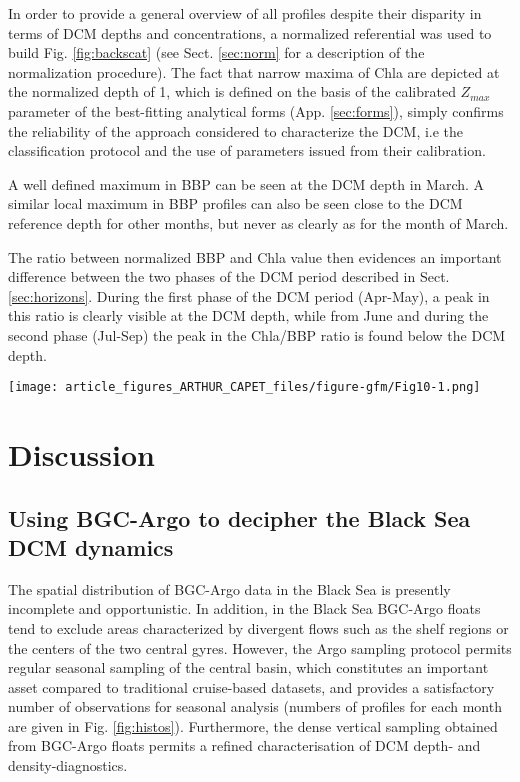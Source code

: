 \documentclass[journal abbreviation, manuscript]{copernicus}
\begin{document}
In order to provide a general overview of all profiles despite their disparity in terms of DCM depths and concentrations,
a normalized referential was used to build Fig. \ref{fig:backscat} (see Sect. \ref{sec:norm} for a description of the normalization procedure).
The fact that narrow maxima of Chla are depicted at the normalized depth of 1, which is defined on the basis of the calibrated $Z_{max}$ parameter  of the best-fitting analytical forms (App. \ref{sec:forms}), simply confirms the reliability
of the approach considered to characterize the DCM, i.e the classification protocol and the use of parameters issued from their calibration.

A well defined maximum in BBP can be seen at the DCM depth in March.
A similar local maximum in BBP profiles can also be seen close to the DCM reference depth for other months, but never as clearly as for the month of March.

The ratio between normalized BBP and Chla value then evidences an important difference between the two phases of the DCM period described in Sect. \ref{sec:horizons}. 
During the first phase of the DCM period (Apr-May), a peak in this ratio is clearly visible at the DCM depth, while from June and during the second phase (Jul-Sep) the peak in the Chla/BBP ratio is found below the DCM depth.

\begin{figure*}[h!] 
 \centering
    \texttt{[image: article\_figures\_ARTHUR\_CAPET\_files/figure-gfm/Fig10-1.png]}
    \caption{Distribution of normalized Chla and BBP values for different layers of normalized depth. The depth is normalized for each profile so that values of one and zero corresponds to the depths of DCM and MLD, respectively (see Sect. \ref{sec:norm} for the normalization procedure).  }
    \label{fig:backscat}
\end{figure*}

\section{Discussion}
\subsection{Using BGC-Argo to decipher the Black Sea DCM dynamics}
\label{disc1}
The spatial distribution of BGC-Argo data in the Black Sea is presently incomplete and opportunistic. In addition, in the Black Sea BGC-Argo floats tend to exclude areas characterized by divergent flows such as the shelf regions or the centers of the two central gyres.
However, the Argo sampling protocol permits regular seasonal sampling of the central basin, which constitutes an important asset compared to traditional cruise-based datasets, and provides a satisfactory number of observations for seasonal analysis (numbers of profiles for each month are given in Fig. \ref{fig:histos}). 
Furthermore, the dense vertical sampling obtained from BGC-Argo floats permits a refined characterisation of DCM depth- and density-diagnostics. 
\end{document}
